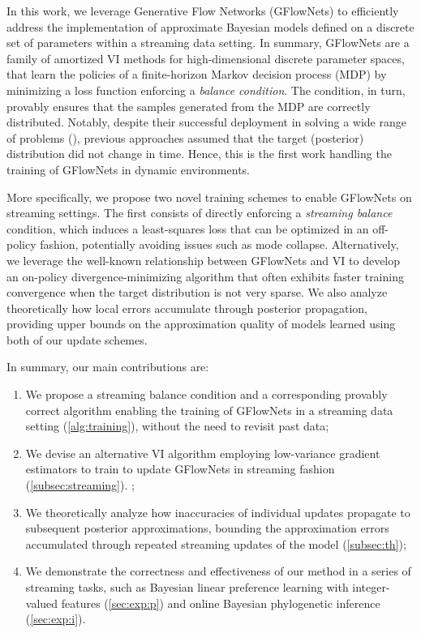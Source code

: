 \documentclass{article}
\theoremstyle{plain}
\theoremstyle{definition}
\theoremstyle{remark}
\theoremstyle{remark}
\begin{document}
In this work, we leverage Generative Flow Networks  (GFlowNets) \cite{Foundations, theory, Bengio2021} to efficiently address the implementation of approximate Bayesian models defined on a discrete set of parameters within a streaming data setting. 
In summary, GFlowNets are a family of amortized VI methods for high-dimensional discrete parameter spaces, that learn the policies of a finite-horizon Markov decision process (MDP) by minimizing a loss function enforcing a \textit{balance condition}. The condition, in turn, provably ensures that the samples generated from the MDP are correctly distributed. Notably, despite their successful deployment in solving a wide range of problems (\cite{discretegfn_ii, zhou2024phylogfn, deleu2022bayesian, deleu2023joint, li2023gfnsr, mogfn, hu2023amortizing, liu2023dropout}), previous approaches assumed that the target (posterior) distribution did not change in time. Hence, this is the first work handling the training of GFlowNets in dynamic environments. 

More specifically, we propose two novel training schemes to enable GFlowNets on streaming settings. The first consists of directly enforcing a \emph{streaming balance} condition, which induces a least-squares loss that can be optimized in an off-policy fashion, potentially avoiding issues such as mode collapse. Alternatively, we leverage the well-known relationship between GFlowNets and VI to develop an on-policy divergence-minimizing algorithm that often exhibits faster training convergence when the target distribution is not very sparse.  
We also analyze theoretically how local errors accumulate through posterior propagation, providing upper bounds on the approximation quality of models learned using both of our update schemes.

In summary, our main contributions are: 
\begin{enumerate}[labelindent=12pt]
    \item We propose a {streaming balance condition} and a corresponding provably correct algorithm enabling the training of GFlowNets in a streaming data setting  (\autoref{alg:training}), without the need to revisit past data; %
    \item We devise an alternative VI algorithm employing low-variance gradient estimators to train to update GFlowNets in streaming fashion (\autoref{subsec:streaming}). ; 
    \item We theoretically analyze how inaccuracies of individual updates propagate to subsequent posterior approximations, bounding the approximation errors accumulated through repeated streaming updates of the model (\autoref{subsec:th}); %
    \item We demonstrate the correctness and effectiveness of our method in a series of streaming tasks, such as Bayesian linear preference learning with integer-valued features (\autoref{sec:exp:p}) and online Bayesian phylogenetic inference (\autoref{sec:exp:i}).
\end{enumerate}
\end{document}
